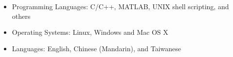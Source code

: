 \documentclass[10pt]{article}
\renewcommand{\section}[1]{\pagebreak[3]%
    \hyphenpenalty=10000%
    \vspace{1.3\baselineskip}%
    \phantomsection\addcontentsline{toc}{section}{#1}%
    \noindent\llap{\scshape\smash{\parbox[t]{\marginparwidth}{\raggedright #1}}}%
    \vspace{-\baselineskip}\par}
\newenvironment{innerlist}[1][\enskip\textbullet]%
        {\begin{itemize}[#1,leftmargin=*,parsep=0pt,itemsep=0pt,topsep=0pt,partopsep=0pt]}
        {\end{itemize}}
\newcommand{\halfblankline}{\quad\vspace{-0.5\baselineskip}\pagebreak[3]}
\providecommand\Matlab{\textsc{Matlab}}
\begin{document}
\begin{itemize}[leftmargin=0pt,parsep=3pt,itemsep=0pt,topsep=0pt,partopsep=0pt]
\item[] Programming Languages: C/C++, MATLAB, UNIX shell scripting, and others
\item[] Operating Systems: Linux, Windows and Mac OS X
\item[] Languages: English, Chinese (Mandarin), and Taiwanese
\end{itemize}
%
%
%
%
%
%
%
\end{document}
